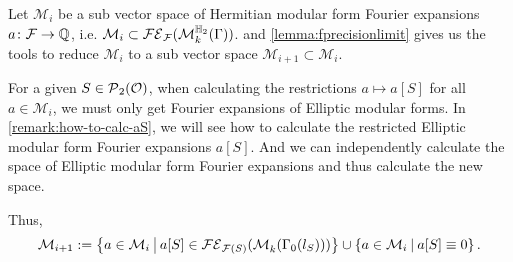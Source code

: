 \begin{remark}
\label{remark:algo-mainstep1}
Let $\mathcal{M}_i$ be a sub vector space of Hermitian modular form Fourier expansions $a \colon \mathcal{F} \rightarrow \mathbb{Q}$, i.e. $\mathcal{M}_i \subset \mathcal{FE}_{\mathcal{F}}(\operatorname{\mathcal{M}}^{\mathbb{H}_{2}}_k (\Gamma))$.
 and \cref{lemma:fprecisionlimit} gives us the tools to reduce $\mathcal{M}_i$ to a sub vector space $\mathcal{M}_{i+1} \subset \mathcal{M}_i$.

For a given $S \in \operatorname{\mathcal{P}}_2(\mathcal{O})$, when calculating the restrictions $a \mapsto a[S]$ for all $a \in \mathcal{M}_i$, we must only get Fourier expansions of Elliptic modular forms.
In \cref{remark:how-to-calc-aS}, we will see how to calculate the restricted Elliptic modular form Fourier expansions $a[S]$.
And we can independently calculate the space of Elliptic modular form Fourier expansions and thus calculate the new space.

Thus,
\[  \mathcal{M}_{i+1} := \Set{a \in \mathcal{M}_i}{a[S] \in \FE_{\F(S)}(\ESpace{k}{\Gamma_0(l_S)})} \cup \Set{a \in \mathcal{M}_i}{a[S] \equiv 0}. \]
\end{remark}

